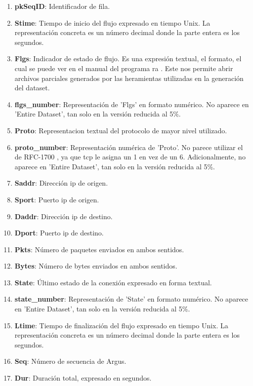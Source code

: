 \begin{enumerate}
    \item \textbf{pkSeqID}: Identificador de fila.
    \item \textbf{Stime}: Tiempo de inicio del flujo expresado en tiempo Unix. La representación concreta es un número decimal donde la parte entera es los segundos.
    \item \textbf{Flgs}: Indicador de estado de flujo. Es una expresión textual, el formato, el cual se puede ver en el manual del programa ra \cite{ratool}. Este nos permite abrir archivos parciales generados por las heramientas utilizadas en la generación del dataset.
    \item \textbf{flgs\_number}: Representación de 'Flgs' en formato numérico. No aparece en 'Entire Dataset', tan solo en la versión reducida al 5\%.
    \item \textbf{Proto}: Representacion textual del protocolo de mayor nivel utilizado.
    \item \textbf{proto\_number}: Representación numérica de 'Proto'. No parece utilizar el de RFC-1700 \cite{rfc1700}, ya que \acrshort{tcp} le asigna un 1 en vez de un 6. Adicionalmente, no aparece en 'Entire Dataset', tan solo en la versión reducida al 5\%.
    \item \textbf{Saddr}: Dirección \acrshort{ip} de origen.
    \item \textbf{Sport}: Puerto \acrshort{ip} de origen.
    \item \textbf{Daddr}: Dirección \acrshort{ip} de destino.
    \item \textbf{Dport}: Puerto \acrshort{ip} de destino.
    \item \textbf{Pkts}: Número de paquetes enviados en ambos sentidos.
    \item \textbf{Bytes}: Número de bytes enviados en ambos sentidos.
    \item \textbf{State}: Último estado de la conexión expresado en forma textual.
    \item \textbf{state\_number}: Representación de 'State' en formato numérico. No aparece en 'Entire Dataset', tan solo en la versión reducida al 5\%.
    \item \textbf{Ltime}: Tiempo de finalización del flujo expresado en tiempo Unix. La representación concreta es un número decimal donde la parte entera es los segundos.
    \item \textbf{Seq}: Número de secuencia de Argus.
    \item \textbf{Dur}: Duración total, expresado en segundos.

\end{enumerate}
